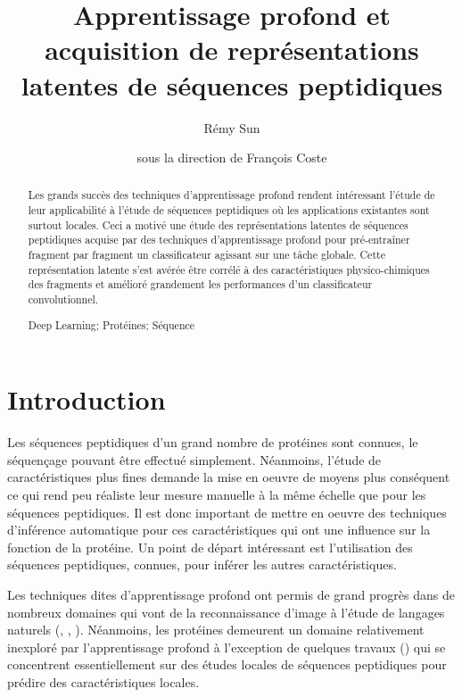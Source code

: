 \documentclass[a4paper, 11pt, onecolumn]{article}
\title{Apprentissage profond et acquisition de représentations latentes de séquences peptidiques}
\author{Rémy Sun \and sous la direction de François Coste}
\newenvironment{keywords}%
{\description\item[Mots-clés.]}%
{\enddescription}
\begin{document}
\maketitle

\begin{abstract}
  Les grands succès des techniques d'apprentissage profond rendent intéressant
  l'étude de leur applicabilité à l'étude de séquences peptidiques où les
  applications existantes sont surtout locales. Ceci a motivé une étude des représentations latentes de séquences
  peptidiques acquise par des techniques d'apprentissage profond pour
  pré-entraîner fragment par fragment un classificateur agissant sur une tâche
  globale. Cette représentation latente s'est avérée être corrélé à des
  caractéristiques physico-chimiques des fragments et amélioré grandement les
  performances d'un classificateur convolutionnel.
  \begin{keywords}
    Deep Learning; Protéines; Séquence
  \end{keywords}
\end{abstract}

\section*{Introduction}


Les séquences peptidiques d'un grand nombre de protéines sont connues, le
séquençage pouvant être effectué simplement. Néanmoins, l'étude de caractéristiques plus
fines demande la mise en oeuvre de moyens plus conséquent ce qui rend peu
réaliste leur mesure manuelle à la même échelle que pour les séquences
peptidiques. Il est donc important de mettre en oeuvre des techniques
d'inférence automatique pour ces caractéristiques qui ont une influence sur la
fonction de la protéine. Un point de départ intéressant est l'utilisation des
séquences peptidiques, connues, pour inférer les autres caractéristiques.

Les techniques dites d'apprentissage profond ont permis de grand progrès dans de
nombreux domaines qui vont de la reconnaissance d'image à l'étude de langages
naturels (\cite{DBLP:journals/corr/ChoMGBSB14}, \cite{socher2011semi}, \cite{NIPS2014_5346}). Néanmoins, les
protéines demeurent un domaine relativement inexploré par l'apprentissage
profond à l'exception de quelques travaux
(\cite{Spencer:2015:DLN:2817095.2817106}) qui se concentrent essentiellement sur
des études locales de séquences peptidiques pour prédire des caractéristiques locales.
\end{document}
